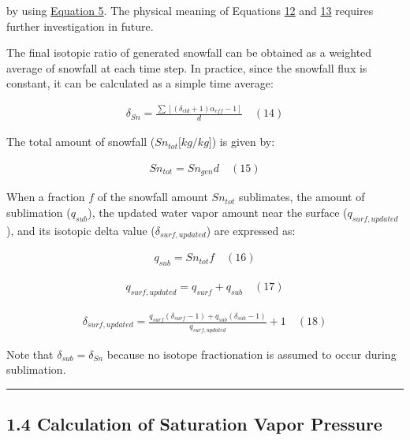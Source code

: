 \documentclass[11pt]{article}
\begin{document}
by using \hyperref[eq5]{Equation 5}. The physical meaning of Equations \hyperref[eq12]{12} and
\hyperref[eq13]{13} requires further investigation in future.

The final isotopic ratio of generated snowfall can be obtained as a weighted average of snowfall at
each time step. In practice, since the snowfall flux is constant, it can be calculated as a simple
time average:

\[
\begin{array}{r}
\delta_{Sn} = \frac{\sum\left\lbrack \left( \delta_{cld} + 1 \right)\alpha_{eff} - 1 \right\rbrack}{d} \quad (14)
\end{array}
\]

The total amount of snowfall (\(Sn_{tot}\lbrack kg/kg\rbrack\)) is given by:

\[
\begin{array}{r}
Sn_{tot} = Sn_{gen}d \quad (15)
\end{array}
\]

When a fraction \(f\) of the snowfall amount \(Sn_{tot}\) sublimates, the amount of sublimation
(\(q_{sub}\)), the updated water vapor amount near the surface (\(q_{surf,updated}\)), and its
isotopic delta value (\(\delta_{surf,updated}\)) are expressed as:

\[
\begin{array}{r}
q_{sub} = Sn_{tot}f \quad (16)
\end{array}
\]

\[
\begin{array}{r}
q_{surf,updated} = q_{surf} + q_{sub} \quad (17)
\end{array}
\]

\[
\begin{array}{r}
\delta_{surf,updated} = \frac{q_{surf}\left( \delta_{surf} - 1 \right) + q_{sub}\left( \delta_{sub} - 1 \right)}{q_{surf,updated}} + 1 \quad (18)
\end{array}
\]

Note that \(\delta_{sub} = \delta_{Sn}\) because no isotope fractionation is assumed to occur during
sublimation.

\begin{center}\rule{0.5\linewidth}{0.5pt}\end{center}

\subsection{1.4 Calculation of Saturation Vapor
Pressure}\label{calculation-of-saturation-vapor-pressure}
\end{document}
